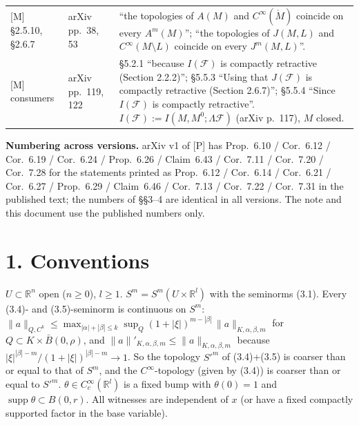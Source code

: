 \documentclass[11pt]{article}
\newcommand{\R}{\mathbb{R}}
\newcommand{\supp}{\operatorname{supp}}
\newcommand{\Mo}{\mathring{M}}
\begin{document}
{\begin{longtable}{@{}p{}p{}p{}@{}}
{[M]} \S2.5.10, \S2.6.7 & arXiv pp.~38, 53 & ``the topologies of $A(M)$ and $C^\infty(\Mo)$ coincide on every $A^m(M)$''; ``the topologies of $J(M,L)$ and $C^\infty(M\setminus L)$ coincide on every $J^m(M,L)$''.\\
{[M]} consumers & arXiv pp.~119, 122 & \S5.2.1 ``because $I(\mathcal F)$ is compactly retractive (Section 2.2.2)''; \S5.5.3 ``Using that $J(\mathcal F)$ is compactly retractive (Section 2.6.7)''; \S5.5.4 ``Since $I(\mathcal F)$ is compactly retractive''. $I(\mathcal F):=I(M,M^0;\Lambda\mathcal F)$ (arXiv p.~117), $M$ closed.\\
\hline
\end{longtable}
}

\noindent\textbf{Numbering across versions.} arXiv v1 of [P] has Prop.~6.10 / Cor.~6.12 / Cor.~6.19 / Cor.~6.24 / Prop.~6.26 / Claim~6.43 / Cor.~7.11 / Cor.~7.20 / Cor.~7.28 for the statements printed as Prop.~6.12 / Cor.~6.14 / Cor.~6.21 / Cor.~6.27 / Prop.~6.29 / Claim~6.46 / Cor.~7.13 / Cor.~7.22 / Cor.~7.31 in the published text; the numbers of \S\S3--4 are identical in all versions. The note and this document use the published numbers only.

\section*{1. Conventions}
$U\subset\R^n$ open ($n\ge0$), $l\ge1$. $S^m=S^m(U\times\R^l)$ with the seminorms (3.1). Every (3.4)- and (3.5)-seminorm is continuous on $S^m$: $\|a\|_{Q,C^k}\le\max_{|\alpha|+|\beta|\le k}\sup_Q(1+|\xi|)^{m-|\beta|}\,\|a\|_{K,\alpha,\beta,m}$ for $Q\subset K\times\bar B(0,\rho)$, and $\|a\|'_{K,\alpha,\beta,m}\le\|a\|_{K,\alpha,\beta,m}$ because $|\xi|^{|\beta|-m}/(1+|\xi|)^{|\beta|-m}\to1$. So the topology $S'^m$ of (3.4)+(3.5) is coarser than or equal to that of $S^m$, and the $C^\infty$-topology (given by (3.4)) is coarser than or equal to $S'^m$. $\theta\in C_c^\infty(\R^l)$ is a fixed bump with $\theta(0)=1$ and $\supp\theta\subset B(0,r)$. All witnesses are independent of $x$ (or have a fixed compactly supported factor in the base variable).
\end{document}
